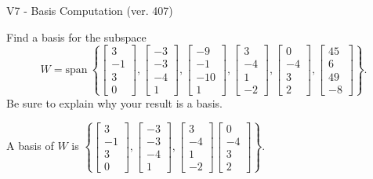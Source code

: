 \begin{exercise}
  \begin{exerciseTitle}V7 - Basis Computation (ver. 407)\end{exerciseTitle}
  \begin{exerciseStatement}
    Find a basis for the subspace 
\[W=\mathrm{span}\ \left\{\left[\begin{array}{r}
3 \\
-1 \\
3 \\
0
\end{array}\right] , \left[\begin{array}{r}
-3 \\
-3 \\
-4 \\
1
\end{array}\right] , \left[\begin{array}{r}
-9 \\
-1 \\
-10 \\
1
\end{array}\right] , \left[\begin{array}{r}
3 \\
-4 \\
1 \\
-2
\end{array}\right] , \left[\begin{array}{r}
0 \\
-4 \\
3 \\
2
\end{array}\right] , \left[\begin{array}{r}
45 \\
6 \\
49 \\
-8
\end{array}\right]\right\}.\]
 Be sure to explain why your result is a basis.


  \end{exerciseStatement}
  \begin{exerciseAnswer}
   A basis of \(W\) is  \(\left\{\left[\begin{array}{r}
3 \\
-1 \\
3 \\
0
\end{array}\right] , \left[\begin{array}{r}
-3 \\
-3 \\
-4 \\
1
\end{array}\right] , \left[\begin{array}{r}
3 \\
-4 \\
1 \\
-2
\end{array}\right] \left[\begin{array}{r}
0 \\
-4 \\
3 \\
2
\end{array}\right]\right\}\).
  


  \end{exerciseAnswer}
\end{exercise}